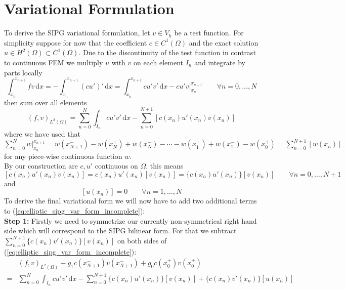 \section{Variational Formulation}
To derive the SIPG variational formulation, let $v \in V_h$ be a test
function. For simplicity suppose for now that the coefficient $c \in C^1(\Omega)$ and
the exact solution $u \in H^2(\Omega) \subset C^1(\Omega)$. 
Due to the discontinuity of the test function in contrast to 
continuous FEM we multiply $u$ with $v$ on each element $I_n$
and integrate by parts locally
\begin{equation*}
    \int_{x_n}^{x_{n+1}} fv\, \text{d}x = -\int_{x_n}^{x_{n+1}} (cu')'\, \text{d}x 
    = \int_{x_n}^{x_{n+1}} cu'v'\, \text{d}x 
    -  cu'v\Big|_{x_n}^{x_{n+1}} \qquad \forall n=0,\ldots,N
\end{equation*}
then sum over all elements
\begin{equation}
    \label{eq:elliptic_sipg_var_form_incomplete}
    (f,v)_{L^2(\Omega)} = \sum_{n=0}^N \int_{I_n} cu'v'\, \text{d}x 
    -\sum_{n=0}^{N+1} [c(x_n)u'(x_n)v(x_n)]
\end{equation}
where we have used that $\sum_{n=0}^N  w \Big|_{x_n}^{x_{n+1}} = w(x_{N+1}^-) - 
w(x_{N}^+) + w(x_{N}^-) - \cdots - w(x_1^+) + w(x_1^-) - w(x_0^+) = \sum_{n=0}^{N+1} [w(x_n)]$ for any piece-wise continuous function $w$.
\\
By our construction are $c, u'$ continuous on $\Omega$, this means 
\begin{equation}
    \label{eq:id_1_cu_jump_zero}
        [c(x_n)u'(x_n)v(x_n)] = c(x_n)u'(x_n)[v(x_n)] = \{c(x_n)u'(x_n)\}[v(x_n)] \qquad \forall n=0,\ldots,N+1
\end{equation}
and 
\begin{equation}
    \label{eq:id_2_u_jump_zero}
    [u(x_n)] = 0 \qquad \forall n=1,\ldots,N
\end{equation}
To derive the final variational form we will now have to add two additional terms
to (\ref{eq:elliptic_sipg_var_form_incomplete}): \\
\textbf{Step 1:} Firstly we need to symmetrize our currently non-symmetrical right hand side
which will correspond to the SIPG bilinear form.
For that we subtract $\sum_{n=0}^{N+1} \{c(x_n)v'(x_n)\}[v(x_n)]$ on both sides of
(\ref{eq:elliptic_sipg_var_form_incomplete}):
\begin{align*}
    &(f,v)_{L^2(\Omega)}-g_1c(x_{N+1}^-)v(x_{N+1}^-) + g_0c(x_0^+)v(x_0^+) \\
    = &\sum_{n=0}^N \int_{I_n} cu'v'\, \text{d}x 
    -\sum_{n=0}^{N+1} \{c(x_n)u'(x_n)\}[v(x_n)] + \{c(x_n)v'(x_n)\}[u(x_n)]
\end{align*}
